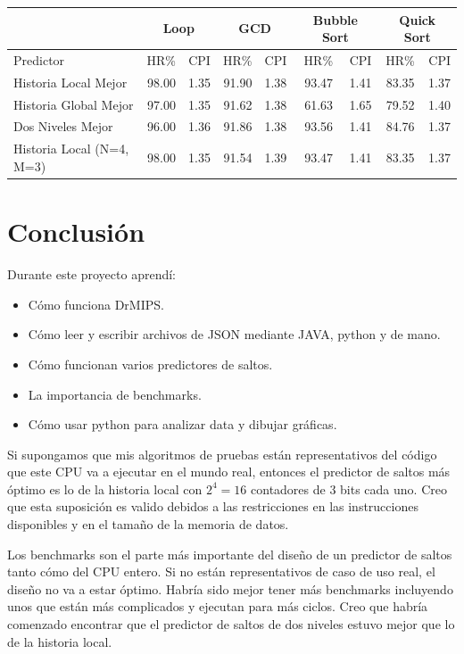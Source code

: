 \documentclass[a4paper]{article}
\begin{document}
\begin{tabular}{|l|rr|rr|rr|rr|}
\cline{2-9}
\multicolumn{1}{c}{} & \multicolumn{2}{|c}{Loop} & \multicolumn{2}{|c}{GCD} & \multicolumn{2}{|c}{Bubble Sort} & \multicolumn{2}{|c|}{Quick Sort} \\ \hline
Predictor & HR\% & CPI & HR\% & CPI & HR\% & CPI & HR\% & CPI \\ \hline
Historia Local Mejor & 98.00	& 1.35 & 91.90 & 1.38 & 93.47 & 1.41 & 83.35 & 1.37 \\
Historia Global	Mejor & 97.00	& 1.35 & 91.62 & 1.38 & 61.63 & 1.65 & 79.52 & 1.40 \\
Dos Niveles Mejor & 96.00	& 1.36 & 91.86 & 1.38 & 93.56 & 1.41 & 84.76 & 1.37 \\ \hline
Historia Local (N=4, M=3) & 98.00	& 1.35 & 91.54 & 1.39 & 93.47 & 1.41 & 83.35 & 1.37 \\
\hline
\end{tabular}

\section{Conclusión}

Durante este proyecto aprendí:

\begin{itemize}
    \item Cómo funciona DrMIPS.
    \item Cómo leer y escribir archivos de JSON mediante JAVA, python y de mano.
    \item Cómo funcionan varios predictores de saltos.
    \item La importancia de benchmarks.
    \item Cómo usar python para analizar data y dibujar gráficas.
\end{itemize}

Si supongamos que mis algoritmos de pruebas están representativos del código que este CPU va a ejecutar en el mundo real, entonces el predictor de saltos más óptimo es lo de la historia local con $2^4 = 16$ contadores de 3 bits cada uno. Creo que esta suposición es valido debidos a las restricciones en las instrucciones disponibles y en el tamaño de la memoria de datos.

Los benchmarks son el parte más importante del diseño de un predictor de saltos tanto cómo del CPU entero. Si no están representativos de caso de uso real, el diseño no va a estar óptimo. Habría sido mejor tener más benchmarks incluyendo unos que están más complicados y ejecutan para más ciclos. Creo que habría comenzado encontrar que el predictor de saltos de dos niveles estuvo mejor que lo de la historia local.
\end{document}
